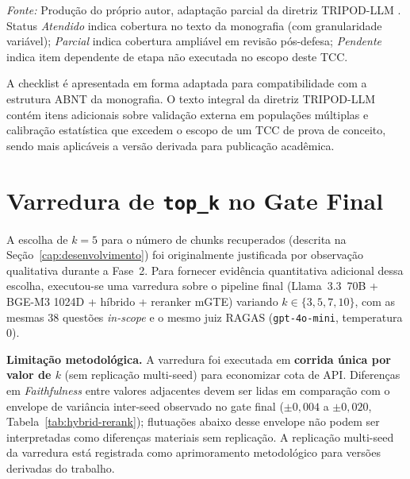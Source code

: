 \documentclass[
  12pt,
  oneside,
  a4paper,
  english,
  brazil
]{abntex2}
\begin{document}
\begin{apendicesenv}
\noindent\textit{Fonte:} Produção do próprio autor, adaptação parcial da
diretriz TRIPOD-LLM \cite{gallifant2025tripod}. Status \emph{Atendido}
indica cobertura no texto da monografia (com granularidade variável);
\emph{Parcial} indica cobertura ampliável em revisão pós-defesa;
\emph{Pendente} indica item dependente de etapa não executada no escopo
deste TCC.

A checklist é apresentada em forma adaptada para compatibilidade com a
estrutura ABNT da monografia. O texto integral da diretriz TRIPOD-LLM
\cite{gallifant2025tripod} contém itens adicionais sobre validação externa
em populações múltiplas e calibração estatística que excedem o escopo de
um TCC de prova de conceito, sendo mais aplicáveis a versão derivada para
publicação acadêmica.

\chapter{Varredura de \texttt{top\_k} no Gate Final}
\label{ape:topk-sweep}

A escolha de $k = 5$ para o número de chunks recuperados (descrita na
Seção~\ref{cap:desenvolvimento}) foi originalmente justificada por
observação qualitativa durante a Fase~2. Para fornecer evidência
quantitativa adicional dessa escolha, executou-se uma varredura sobre o
pipeline final (Llama~3.3~70B + BGE-M3 1024D + híbrido + reranker mGTE)
variando $k \in \{3, 5, 7, 10\}$, com as mesmas 38 questões \textit{in-scope}
e o mesmo juiz RAGAS (\texttt{gpt-4o-mini}, temperatura $0$).

\textbf{Limitação metodológica.} A varredura foi executada em \textbf{corrida
única por valor de $k$} (sem replicação multi-seed) para economizar cota
de API. Diferenças em \textit{Faithfulness} entre valores adjacentes devem
ser lidas em comparação com o envelope de variância inter-seed observado
no gate final ($\pm 0{,}004$ a $\pm 0{,}020$, Tabela~\ref{tab:hybrid-rerank});
flutuações abaixo desse envelope não podem ser interpretadas como diferenças
materiais sem replicação. A replicação multi-seed da varredura está
registrada como aprimoramento metodológico para versões derivadas do
trabalho.


\end{apendicesenv}
\end{document}
